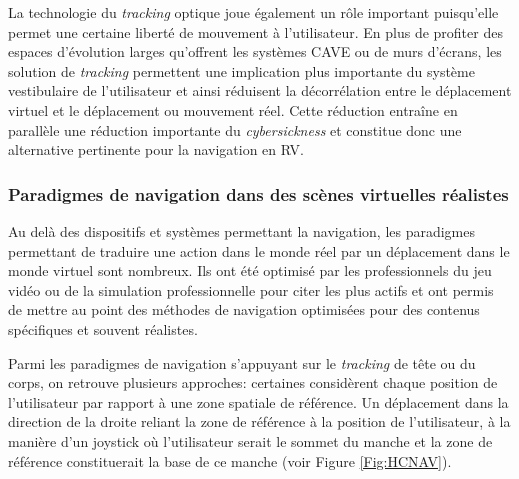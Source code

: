 La technologie du \textit{tracking} optique joue également un rôle important puisqu'elle permet une certaine liberté de mouvement à l'utilisateur. En plus de profiter des espaces d'évolution larges qu'offrent les systèmes CAVE ou de murs d'écrans, les solution de \textit{tracking} permettent une implication plus importante du système vestibulaire de l'utilisateur et ainsi réduisent la décorrélation entre le déplacement virtuel et le déplacement ou mouvement réel. Cette réduction entraîne en parallèle une réduction importante du \textit{cybersickness} et constitue donc une alternative pertinente pour la navigation en RV.

\subsubsection{Paradigmes de navigation dans des scènes virtuelles réalistes}

Au delà des dispositifs et systèmes permettant la navigation, les paradigmes permettant de traduire une action dans le monde réel par un déplacement dans le monde virtuel sont nombreux. Ils ont été optimisé par les professionnels du jeu vidéo ou de la simulation professionnelle pour citer les plus actifs et ont permis de mettre au point des méthodes de navigation optimisées pour des contenus spécifiques et souvent réalistes.

Parmi les paradigmes de navigation s'appuyant sur le \textit{tracking} de tête ou du corps, on retrouve plusieurs approches: certaines considèrent chaque position de l'utilisateur par rapport à une zone spatiale de référence. Un déplacement dans la direction de la droite reliant la zone de référence à la position de l'utilisateur, à la manière d'un joystick où l'utilisateur serait le sommet du manche et la zone de référence constituerait la base de ce manche (voir Figure \ref{Fig:HCNAV}).


